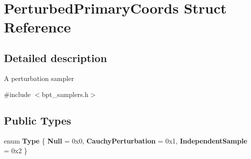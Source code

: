 \hypertarget{struct_perturbed_primary_coords}{}\section{Perturbed\+Primary\+Coords Struct Reference}
\label{struct_perturbed_primary_coords}


\subsection{Detailed description}
A perturbation sampler 

{\ttfamily \#include $<$bpt\+\_\+samplers.\+h$>$}

\subsection*{Public Types}
\begin{DoxyCompactItemize}
\item 
\mbox{\label{struct_perturbed_primary_coords_a9bbcc445564834746ae6b9324d55537f}} 
enum {\bfseries Type} \{ {\bfseries Null} = 0x0, 
{\bfseries Cauchy\+Perturbation} = 0x1, 
{\bfseries Independent\+Sample} = 0x2
 \}
\end{DoxyCompactItemize}
